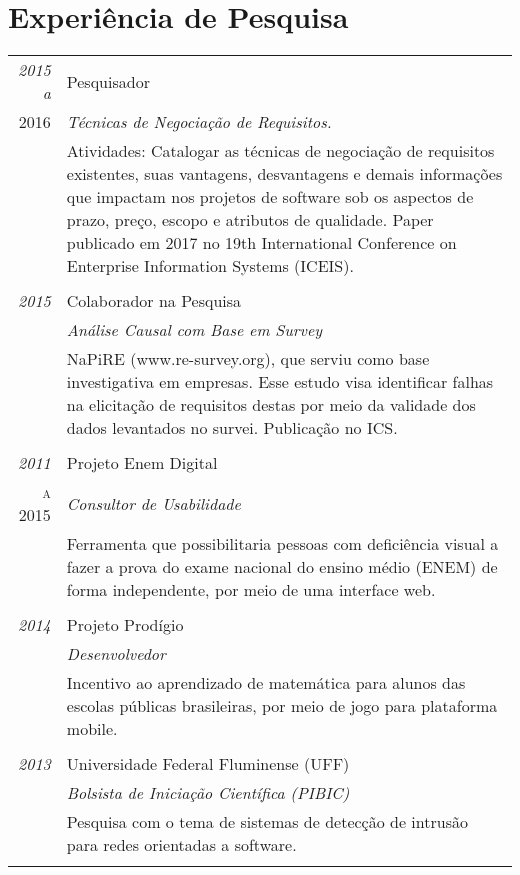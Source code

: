 \documentclass[a4paper,10pt]{article}
\begin{document}
 \section{Experiência de Pesquisa}
\begin{tabular}{r|p{11cm}}
 \emph{2015 a} & Pesquisador \\
 \textsc{2016}&\emph{Técnicas de Negociação de Requisitos.}\\
 &\footnotesize{Atividades: Catalogar as técnicas de negociação de requisitos existentes, suas vantagens, desvantagens e demais informações que impactam nos projetos de software sob os aspectos de prazo, preço, escopo e atributos de qualidade. Paper publicado em 2017 no 19th International Conference on Enterprise Information Systems (ICEIS).}\\
 
 & \\
 
 \emph{2015} & Colaborador na Pesquisa \\
 \textsc{}&\emph{Análise Causal com Base em Survey}\\
 &\footnotesize{NaPiRE (www.re-survey.org), que serviu como base investigativa em empresas. Esse estudo visa identificar falhas na elicitação de requisitos destas por meio da validade dos dados levantados no survei. Publicação no ICS.}\\
 
 & \\
 
 \emph{2011} & Projeto Enem Digital \\
 \textsc{a 2015}&\emph{Consultor de Usabilidade}\\
 &\footnotesize{Ferramenta que possibilitaria pessoas com deficiência visual a fazer a prova do exame nacional do ensino médio (ENEM) de forma independente, por meio de uma interface web.}\\
 
 & \\
 
 \emph{2014} & Projeto Prodígio \\
 \textsc{}&\emph{Desenvolvedor}\\
 &\footnotesize{Incentivo ao aprendizado de matemática para alunos das escolas públicas brasileiras, por meio de jogo para plataforma mobile.}\\
 
 & \\
 
 \emph{2013} & Universidade Federal Fluminense (UFF) \\
 \textsc{}&\emph{Bolsista de Iniciação Científica (PIBIC)}\\
 &\footnotesize{Pesquisa com o tema de sistemas de detecção de intrusão para redes orientadas a software. }\\
 
 \multicolumn{2}{c}{} \end{tabular}
\end{document}
